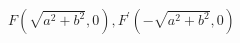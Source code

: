 \documentclass[preview]{standalone}
\begin{document}
\begin{align*}
F(\sqrt{a^2+b^2}, 0), F^\prime(-\sqrt{a^2+b^2}, 0)
\end{align*}
\end{document}
